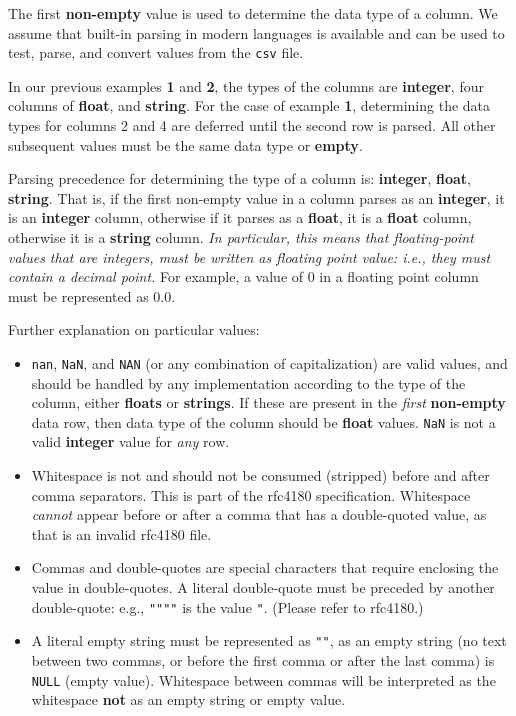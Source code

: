 The first \textbf{non-empty} value is used to determine the data type of a
column.  We assume that built-in parsing in modern languages is available and
can be used to test, parse, and convert values from the \texttt{\small csv}
file.

In our previous examples {\bf 1} and {\bf 2}, the types of the columns are 
\textbf{integer}, four columns of \textbf{float}, and \textbf{string}. For
the case of example {\bf 1}, determining the data types for columns 2 and 4 
are deferred until the second row is parsed. All other subsequent values must 
be the same data type or \textbf{empty}.

Parsing precedence for determining the type of a column is: \textbf{integer},
\textbf{float}, \textbf{string}. That is, if the first non-empty value in a
column parses as an \textbf{integer}, it is an \textbf{integer} column,
otherwise if it parses as a \textbf{float}, it is a \textbf{float} column,
otherwise it is a \textbf{string} column. \textit{In particular, this means
that floating-point values that are integers, must be written as floating point
value: i.e., they must contain a decimal point.} For example, a value of 0 in a
floating point column must be represented as 0.0.

Further explanation on particular values:
\begin{itemize}
\item \texttt{\small nan}, \texttt{\small NaN}, and \texttt{NAN} (or any
  combination of capitalization) are valid values, and should be handled by any
  implementation according to the type of the column, either \textbf{floats}
  or \textbf{strings}. If these are present in the \textit{first}
  \textbf{non-empty} data row, then data type of the column should be
  \textbf{float} values. \texttt{\small NaN} is not a valid \textbf{integer}
  value for \textit{any} row.
\item Whitespace is not and should not be consumed (stripped) before and after
  comma separators.  This is part of the rfc4180 specification. Whitespace {\em
  cannot} appear before or after a comma that has a double-quoted value, as
  that is an invalid rfc4180 file.
\item Commas and double-quotes are special characters that require 
  enclosing the value in double-quotes. A literal double-quote must be preceded 
  by another double-quote: e.g., \texttt{\small """"} is the value 
  \texttt{\small "}. (Please refer to rfc4180.)
\item A literal empty string must be represented as \texttt{\small ""}, as an 
  empty string (no text between two commas, or before the first comma
  or after the last comma) is \texttt{\small NULL} (empty value). Whitespace
  between commas will be interpreted as the whitespace \textbf{not} as an
  empty string or empty value.
\end{itemize}

